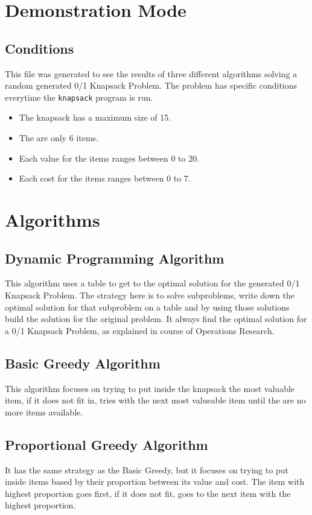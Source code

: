 \chapter*{Demonstration Mode}
\section*{Conditions}
This file was generated to see the results of three different algorithms solving a random generated 0/1 Knapsack Problem.
The problem has specific conditions everytime the \verb|knapsack| program is run.

\begin{itemize}
    \item The knapsack has a maximum size of 15.
    \item The are only 6 items.
    \item Each value for the items ranges between 0 to 20.
    \item Each cost  for the items ranges between 0 to 7.
\end{itemize}

\chapter*{Algorithms}

\section*{Dynamic Programming Algorithm}

This algorithm uses a table to get to the optimal solution for the generated 0/1 Knapsack Problem. The strategy here is to solve
subproblems, write down the optimal solution for that subproblem on a table and by using those solutions build the solution 
for the original problem. It always find the optimal solution for a 0/1 Knapsack Problem, as explained in course of Operations Research.

\section*{Basic Greedy Algorithm}

This algorithm focuses on trying to put inside the knapsack the most valuable item, if it does not fit in, tries with the next
most valueable item until the are no more items available.

\section*{Proportional Greedy Algorithm}

It has the same strategy as the Basic Greedy, but it focuses on trying to put inside items based by their proportion between its
value and cost. The item with highest proportion goes first, if it does not fit, goes to the next item with the highest proportion.